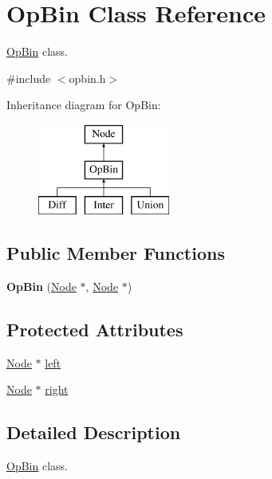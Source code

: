 \hypertarget{class_op_bin}{
\section{\-Op\-Bin \-Class \-Reference}
\label{class_op_bin}
}


\hyperlink{class_op_bin}{\-Op\-Bin} class.  




{\ttfamily \#include $<$opbin.\-h$>$}

\-Inheritance diagram for \-Op\-Bin\-:\begin{figure}[H]
\begin{center}
\leavevmode
\includegraphics[height=3.000000cm]{class_op_bin}
\end{center}
\end{figure}
\subsection*{\-Public \-Member \-Functions}
\begin{DoxyCompactItemize}
\item 
\hypertarget{class_op_bin_a9dbb8dfeff7846ea176eb6ceb72cd729}{
{\bfseries \-Op\-Bin} (\hyperlink{class_node}{\-Node} $\ast$, \hyperlink{class_node}{\-Node} $\ast$)}
\label{class_op_bin_a9dbb8dfeff7846ea176eb6ceb72cd729}

\end{DoxyCompactItemize}
\subsection*{\-Protected \-Attributes}
\begin{DoxyCompactItemize}
\item 
\hyperlink{class_node}{\-Node} $\ast$ \hyperlink{class_op_bin_a5f5db8a000a36f5c609313d0d880ed61}{left}
\item 
\hyperlink{class_node}{\-Node} $\ast$ \hyperlink{class_op_bin_a1c79a6c7464203dbf5aa7167dfbdb301}{right}
\end{DoxyCompactItemize}


\subsection{\-Detailed \-Description}
\hyperlink{class_op_bin}{\-Op\-Bin} class. 

